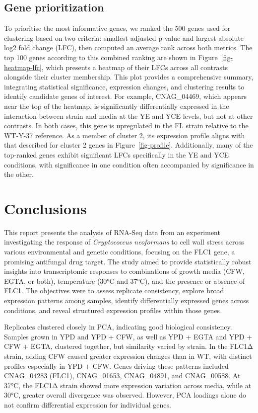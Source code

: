 \documentclass[
  a4paper,
]{scrreprt}
\begin{document}
\section{Gene prioritization}\label{gene-prioritization}

To prioritise the most informative genes, we ranked the 500 genes used
for clustering based on two criteria: smallest adjusted p-value and
largest absolute log2 fold change (LFC), then computed an average rank
across both metrics. The top 100 genes according to this combined
ranking are shown in Figure~\ref{fig-heatmap-lfc}, which presents a
heatmap of their LFCs across all contrasts alongside their cluster
membership. This plot provides a comprehensive summary, integrating
statistical significance, expression changes, and clustering results to
identify candidate genes of interest. For example, CNAG\_04469, which
appears near the top of the heatmap, is significantly differentially
expressed in the interaction between strain and media at the YE and YCE
levels, but not at other contrasts. In both cases, this gene is
upregulated in the FL strain relative to the WT-Y-37 reference. As a
member of cluster 2, its expression profile aligns with that described
for cluster 2 genes in Figure~\ref{fig-profile}. Additionally, many of
the top-ranked genes exhibit significant LFCs specifically in the YE and
YCE conditions, with significance in one condition often accompanied by
significance in the other.


\chapter{Conclusions}\label{sec-conclusions}

This report presents the analysis of RNA-Seq data from an experiment
investigating the response of \emph{Cryptococcus neoformans} to cell
wall stress across various environmental and genetic conditions,
focusing on the FLC1 gene, a promising antifungal drug target. The study
aimed to provide statistically robust insights into transcriptomic
responses to combinations of growth media (CFW, EGTA, or both),
temperature (30°C and 37°C), and the presence or absence of FLC1. The
objectives were to assess replicate consistency, explore broad
expression patterns among samples, identify differentially expressed
genes across conditions, and reveal structured expression profiles
within those genes.

Replicates clustered closely in PCA, indicating good biological
consistency. Samples grown in YPD and YPD + CFW, as well as YPD + EGTA
and YPD + CFW + EGTA, clustered together, but similarity varied by
strain. In the FLC1Δ strain, adding CFW caused greater expression
changes than in WT, with distinct profiles especially in YPD + CFW.
Genes driving these patterns included CNAG\_04283 (FLC1), CNAG\_01653,
CNAG\_04891, and CNAG\_00588. At 37°C, the FLC1Δ strain showed more
expression variation across media, while at 30°C, greater overall
divergence was observed. However, PCA loadings alone do not confirm
differential expression for individual genes.
\end{document}
